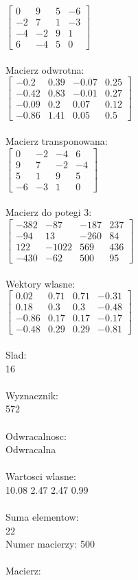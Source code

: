 \documentclass[a4paper,12pt]{article}
\begin{document}
$\begin{bmatrix} 0&9&5&-6\\-2&7&1&-3\\-4&-2&9&1\\6&-4&5&0 \end{bmatrix}$
\\
\\
Macierz odwrotna:\\

$\begin{bmatrix} -0.2&0.39&-0.07&0.25\\-0.42&0.83&-0.01&0.27\\-0.09&0.2&0.07&0.12\\-0.86&1.41&0.05&0.5 \end{bmatrix}$
\\
\\
Macierz transponowana:\\

$\begin{bmatrix} 0&-2&-4&6\\9&7&-2&-4\\5&1&9&5\\-6&-3&1&0 \end{bmatrix}$
\\
\\
Macierz do potegi 3:\\

$\begin{bmatrix} -382&-87&-187&237\\-94&13&-260&84\\122&-1022&569&436\\-430&-62&500&95 \end{bmatrix}$
\\
\\
Wektory wlasne:\\

$\begin{bmatrix} 0.02&0.71&0.71&-0.31\\0.18&0.3&0.3&-0.48\\-0.86&0.17&0.17&-0.17\\-0.48&0.29&0.29&-0.81 \end{bmatrix}$
\\
\\
Slad:\\
16
\\
\\
Wyznacznik:\\
572
\\
\\
Odwracalnosc:\\
Odwracalna
\\
\\
Wartosci wlasne:\\
10.08 2.47 2.47 0.99
\\
\\
Suma elementow:\\
22
\\
\newpage
Numer macierzy:
500
\\
\\
Macierz:\\
\end{document}

